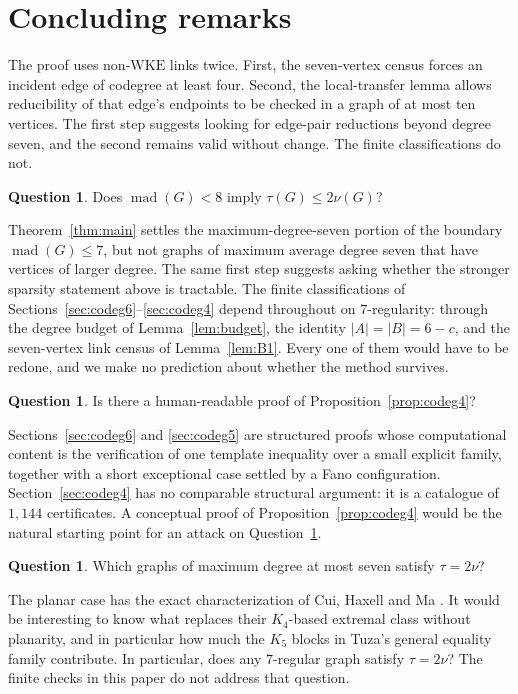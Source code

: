 \documentclass[11pt,a4paper]{amsart}
\theoremstyle{plain}
\theoremstyle{definition}
\newtheorem{question}[theorem]{Question}
\newcommand{\mad}{\operatorname{mad}}
\newcommand{\WKE}{\mathrm{WKE}}
\begin{document}
\section{Concluding remarks}\label{sec:open}

The proof uses non-$\WKE$ links twice. First, the seven-vertex census forces
an incident edge of codegree at least four. Second, the local-transfer lemma
allows reducibility of that edge's endpoints to be checked in a graph of at
most ten vertices. The first step suggests looking for edge-pair reductions
beyond degree seven, and the second remains valid without change. The finite
classifications do not.

\begin{question}\label{q:mad8}
Does $\mad(G)<8$ imply $\tau(G)\le2\nu(G)$?
\end{question}

Theorem~\ref{thm:main} settles the maximum-degree-seven portion of the boundary
$\mad(G)\le7$, but not graphs of maximum average degree seven that have
vertices of larger degree. The same first step suggests asking whether the
stronger sparsity statement above is tractable. The finite classifications of
Sections~\ref{sec:codeg6}--\ref{sec:codeg4} depend throughout on
$7$-regularity: through the degree budget of Lemma~\ref{lem:budget}, the
identity $|A|=|B|=6-c$, and the seven-vertex link census of
Lemma~\ref{lem:B1}. Every one of them would have to be redone, and we make no
prediction about whether the method survives.

\begin{question}\label{q:human}
Is there a human-readable proof of Proposition~\ref{prop:codeg4}?
\end{question}

Sections~\ref{sec:codeg6} and \ref{sec:codeg5} are structured proofs whose
computational content is the verification of one template inequality over a
small explicit family, together with a short exceptional case settled by a
Fano configuration. Section~\ref{sec:codeg4} has no comparable structural
argument: it is a catalogue of $1{,}144$ certificates. A conceptual proof of
Proposition~\ref{prop:codeg4} would be the natural starting point for an
attack on Question~\ref{q:mad8}.

\begin{question}\label{q:equality}
Which graphs of maximum degree at most seven satisfy $\tau=2\nu$?
\end{question}

The planar case has the exact characterization of Cui, Haxell and Ma
\cite{CuiHaxellMa2009}. It would be interesting to know what replaces their
$K_4$-based extremal class without planarity, and in particular how much the
$K_5$ blocks in Tuza's general equality family contribute. In particular,
does any $7$-regular graph satisfy $\tau=2\nu$? The finite checks in this paper
do not address that question.
\end{document}
